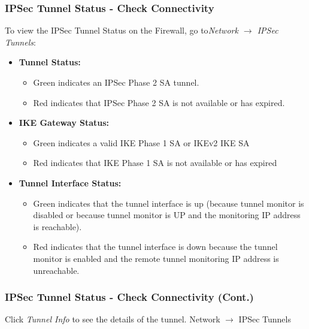 \subsubsection{IPSec Tunnel Status - Check Connectivity}
To view the IPSec Tunnel Status on the Firewall, go to\textit{Network $\rightarrow$ IPSec Tunnels}:
\begin{itemize}
    \item \textbf{Tunnel Status:}
        \begin{itemize}
            \item Green indicates an IPSec Phase 2 SA tunnel.
            \item Red indicates that IPSec Phase 2 SA is not available or has expired.
        \end{itemize}
     \item \textbf{IKE Gateway Status:}
        \begin{itemize}
            \item Green indicates a valid IKE Phase 1 SA or IKEv2 IKE SA
            \item Red indicates that IKE Phase 1 SA is not available or has expired
        \end{itemize}
    \item \textbf{Tunnel Interface Status:}
        \begin{itemize}
            \item Green indicates that the tunnel interface is up (because tunnel monitor is disabled or because tunnel monitor is UP and the monitoring IP address is reachable).
            \item Red indicates that the tunnel interface is down because the tunnel monitor is enabled and the remote tunnel monitoring IP address is unreachable.
        \end{itemize}
\end{itemize}

\subsubsection{IPSec Tunnel Status - Check Connectivity (Cont.)}
Click \textit{Tunnel Info} to see the details of the tunnel. Network $\rightarrow$ IPSec Tunnels

